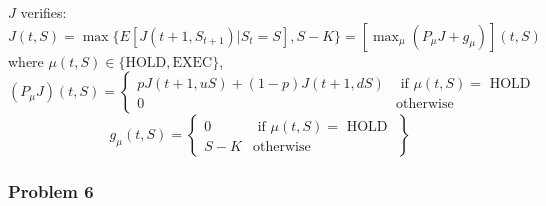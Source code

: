 \documentclass[12pt]{article}
\newcommand{\Q}[1]{\subsubsection*{Problem #1}}
\begin{document}
\begin{enumerate}
  $J$ verifies: $J(t, S) = \max \{ E[J(t+1, S_{t+1}) | S_t = S], S - K \} = [\max_{\mu} (P_{\mu}J + g_\mu) ](t,S) $
  where $\mu(t, S) \in \{ \text{HOLD}, \text{EXEC} \}$,
  \[ (P_\mu J)(t, S) = \left\{
      \begin{array}{cc}
        p J(t+1, uS) + (1-p)J(t+1, dS) & \text{ if $\mu(t, S) = $ HOLD } \\
        0 & \text{otherwise}
      \end{array}
    \right.
  \]
  \[
    g_\mu(t, S) = \left\{
      \begin{array}{cc}
        0 & \text{ if $\mu(t, S) = $ HOLD } \\
        S - K & \text{otherwise}
      \end{array}
    \right\}
  \]
                                                
\end{enumerate}

\Q{6}
\end{document}
